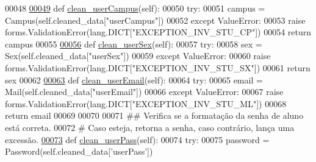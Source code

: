 \begin{DoxyCode}
00048 
\hypertarget{Adm_2forms_8py_source_l00049}{}\hyperlink{classAdm_1_1forms_1_1AdmRegStu__ProfForm_a74730a46efbdfcd4365717fce26b295a}{00049}     \textcolor{keyword}{def }\hyperlink{classAdm_1_1forms_1_1AdmRegStu__ProfForm_a74730a46efbdfcd4365717fce26b295a}{clean\_userCampus}(self):
00050         \textcolor{keywordflow}{try}:
00051             campus = Campus(self.cleaned\_data[\textcolor{stringliteral}{"userCampus"}])
00052         \textcolor{keywordflow}{except} ValueError:
00053             \textcolor{keywordflow}{raise} forms.ValidationError(lang.DICT[\textcolor{stringliteral}{"EXCEPTION\_INV\_STU\_CP"}])
00054         \textcolor{keywordflow}{return} campus
00055 
\hypertarget{Adm_2forms_8py_source_l00056}{}\hyperlink{classAdm_1_1forms_1_1AdmRegStu__ProfForm_ac2623ef3e23567b9916798efd37846aa}{00056}     \textcolor{keyword}{def }\hyperlink{classAdm_1_1forms_1_1AdmRegStu__ProfForm_ac2623ef3e23567b9916798efd37846aa}{clean\_userSex}(self):
00057         \textcolor{keywordflow}{try}:
00058             sex = Sex(self.cleaned\_data[\textcolor{stringliteral}{"userSex"}])
00059         \textcolor{keywordflow}{except} ValueError:
00060             \textcolor{keywordflow}{raise} forms.ValidationError(lang.DICT[\textcolor{stringliteral}{"EXCEPTION\_INV\_STU\_SX"}])
00061         \textcolor{keywordflow}{return} sex
00062 
\hypertarget{Adm_2forms_8py_source_l00063}{}\hyperlink{classAdm_1_1forms_1_1AdmRegStu__ProfForm_a2175e6df2259bcca182c3eb54cef065e}{00063}     \textcolor{keyword}{def }\hyperlink{classAdm_1_1forms_1_1AdmRegStu__ProfForm_a2175e6df2259bcca182c3eb54cef065e}{clean\_userEmail}(self):
00064         \textcolor{keywordflow}{try}:
00065             email = Mail(self.cleaned\_data[\textcolor{stringliteral}{"userEmail"}])
00066         \textcolor{keywordflow}{except} ValueError:
00067             \textcolor{keywordflow}{raise} forms.ValidationError(lang.DICT[\textcolor{stringliteral}{"EXCEPTION\_INV\_STU\_ML"}])
00068         \textcolor{keywordflow}{return} email    
00069     
00070     
00071     \textcolor{comment}{## Verifica se a formatação da senha de aluno está correta.}
00072     \textcolor{comment}{#   Caso esteja, retorna a senha, caso contrário, lança uma excessão.}
\hypertarget{Adm_2forms_8py_source_l00073}{}\hyperlink{classAdm_1_1forms_1_1AdmRegStu__ProfForm_a4ad4a629f7a34d7657b6d308616f5696}{00073}     \textcolor{keyword}{def }\hyperlink{classAdm_1_1forms_1_1AdmRegStu__ProfForm_a4ad4a629f7a34d7657b6d308616f5696}{clean\_userPass}(self):
00074         \textcolor{keywordflow}{try}:
00075             password = Password(self.cleaned\_data[\textcolor{stringliteral}{'userPass'}])

\end{DoxyCode}
